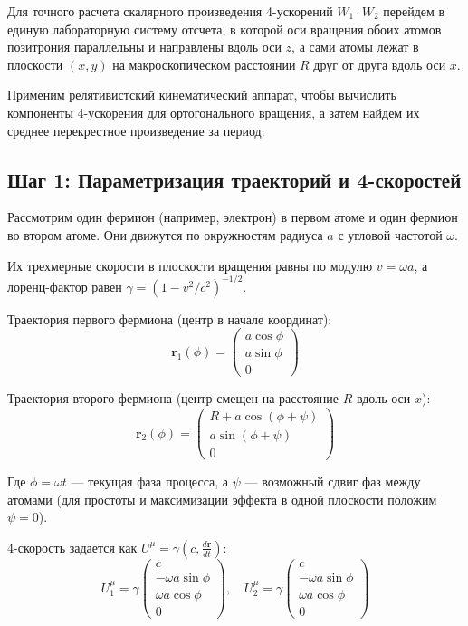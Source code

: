 \documentclass[12pt,a4paper]{article}
\begin{document}
Для точного расчета скалярного произведения 4-ускорений $W_1 \cdot W_2$ перейдем в единую лабораторную систему отсчета, в которой оси вращения обоих атомов позитрония параллельны и направлены вдоль оси $z$, а сами атомы лежат в плоскости $(x, y)$ на макроскопическом расстоянии $R$ друг от друга вдоль оси $x$.

Применим релятивистский кинематический аппарат, чтобы вычислить компоненты 4-ускорения для ортогонального вращения, а затем найдем их среднее перекрестное произведение за период.

\subsection*{Шаг 1: Параметризация траекторий и 4-скоростей}

Рассмотрим один фермион (например, электрон) в первом атоме и один фермион во втором атоме. Они движутся по окружностям радиуса $a$ с угловой частотой $\omega$.

Их трехмерные скорости в плоскости вращения равны по модулю $v = \omega a$, а лоренц-фактор равен $\gamma = (1 - v^2/c^2)^{-1/2}$.

Траектория первого фермиона (центр в начале координат):
\begin{equation}
\mathbf{r}_1(\phi) = \begin{pmatrix} a \cos\phi \\ a \sin\phi \\ 0 \end{pmatrix}
\end{equation}

Траектория второго фермиона (центр смещен на расстояние $R$ вдоль оси $x$):
\begin{equation}
\mathbf{r}_2(\phi) = \begin{pmatrix} R + a \cos(\phi + \psi) \\ a \sin(\phi + \psi) \\ 0 \end{pmatrix}
\end{equation}

Где $\phi = \omega t$ — текущая фаза процесса, а $\psi$ — возможный сдвиг фаз между атомами (для простоты и максимизации эффекта в одной плоскости положим $\psi = 0$).

4-скорость задается как $U^\mu = \gamma \left(c, \frac{d\mathbf{r}}{dt}\right)$:
\begin{equation}
U_1^\mu = \gamma \begin{pmatrix} c \\ -\omega a \sin\phi \\ \omega a \cos\phi \\ 0 \end{pmatrix}, \quad 
U_2^\mu = \gamma \begin{pmatrix} c \\ -\omega a \sin\phi \\ \omega a \cos\phi \\ 0 \end{pmatrix}
\end{equation}
\end{document}

